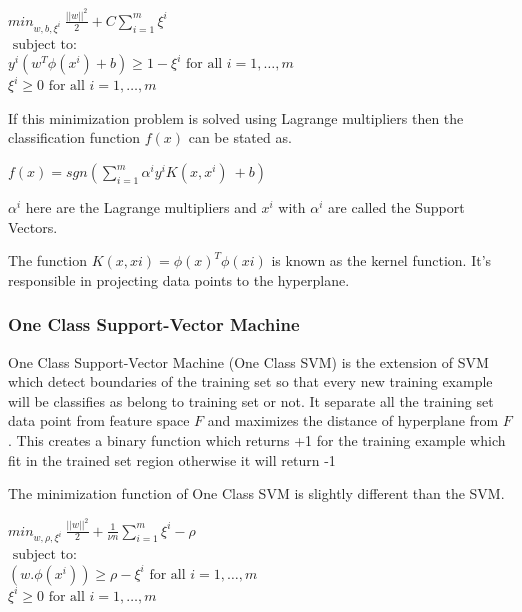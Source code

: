 \documentclass[10pt,oneside,a4paper]{article}
\begin{document}
\begin{center}
  ${min}_{w,b,\xi^i} \ \frac{||w||^2}{2} + C \sum_{i=1}^m \xi^i$ \\
  $\mbox{ subject to: }$ \\
  $y^i( w^T \phi(x^i) + b) \geq 1 - \xi^i \mbox{ for all } i = 1, \dots, m$ \\
  \hspace{3cm} $\xi^i \geq 0 \mbox{ for all } i = 1, \dots, m$ \\
\end{center}

If this minimization problem is solved using Lagrange multipliers then the classification function $f(x)$ can be stated as.

\begin{center}
$f(x)=sgn(\sum_{i=1}^m \alpha^i y^i K(x,x^i) \ + b)$
\end{center}

$\alpha^i$ here are the Lagrange multipliers and $x^i$ with $\alpha^i$ are called the Support Vectors.

The function $K(x,xi)=\phi(x)^T \phi(xi)$ is known as the kernel function. It's responsible in projecting data points to the hyperplane.

\subsubsection{One Class Support-Vector Machine}

One Class Support-Vector Machine (One Class SVM) is the extension of SVM which detect boundaries of the training set so that every new training example will be classifies as belong to training set or not. It separate all the training set data point from feature space $F$ and maximizes the distance of hyperplane from $F$. This creates a binary function which returns +1 for the training example which fit in the trained set region otherwise it will return -1

The minimization function of One Class SVM is slightly different than the SVM. \cite{SVM}

\begin{center}
  ${min}_{w,\rho,\xi^i} \ \frac{||w||^2}{2} + \frac{1}{\nu n} \sum_{i=1}^m \xi^i - \rho$ \\
  $\mbox{ subject to: }$ \\
  $(w.\phi(x^i)) \geq \rho - \xi^i \mbox{ for all } i = 1, \dots, m$ \\
  \hspace{2cm} $\xi^i \geq 0 \mbox{ for all } i = 1, \dots, m$ \\
\end{center}
\end{document}
